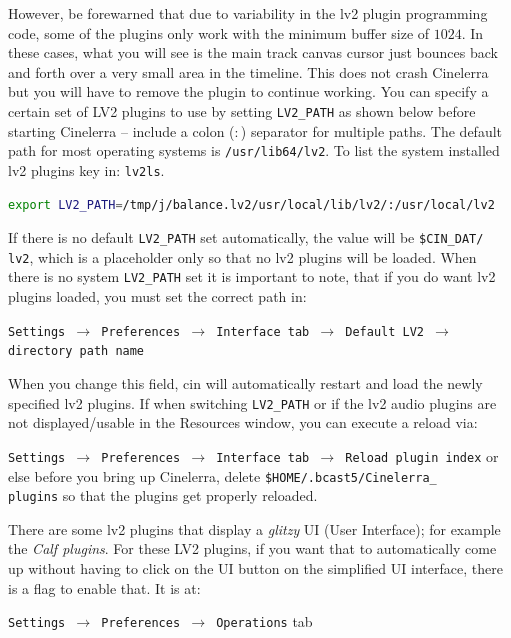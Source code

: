 However, be forewarned that due to variability in the lv2 plugin programming code, some of the plugins only work with the minimum buffer size of $1024$. In these cases, what you will see is the main track canvas cursor just bounces back and forth over a very small area in the timeline. This does not crash Cinelerra but you will have to remove the plugin to continue working.
You can specify a certain set of LV2 plugins to use by setting \texttt{LV2\_PATH} as shown below before starting Cinelerra -- include a colon ($:$) separator for multiple paths. The default path for most operating systems is \texttt{/usr/lib64/lv2}. To list the system installed lv2 plugins key in: \texttt{lv2ls}.

\begin{lstlisting}[language=Bash,numbers=none]
export LV2_PATH=/tmp/j/balance.lv2/usr/local/lib/lv2/:/usr/local/lv2
\end{lstlisting}

If there is no default \texttt{LV2\_PATH} set automatically, the value will be \texttt{\$CIN\_DAT/\\lv2}, which is a placeholder only so that no lv2 plugins will be loaded. When there is no system \texttt{LV2\_PATH} set it is important to note, that if you do want lv2 plugins loaded, you must set the correct path in:

\texttt{Settings $\rightarrow$ Preferences $\rightarrow$ Interface tab $\rightarrow$ Default LV2 $\rightarrow$ direc\-tory 
    path name}

When you change this field, cin will automatically restart and load the newly specified lv2 plugins. If when switching \texttt{LV2\_PATH} or if the lv2 audio plugins are not displayed/usable in the Resources window, you can execute a reload via:

\texttt{Settings $\rightarrow$  Preferences $\rightarrow$ Interface tab $\rightarrow$ Reload plugin in\-dex} 
or else before you bring up Cinelerra, delete \texttt{\$HOME/.bcast5/Cinelerra\_\\plugins} so that the plugins get properly reloaded.

There are some lv2 plugins that display a \textit{glitzy} UI (User Interface); for example the \textit{Calf plugins}. For these LV2 plugins, if you want that to automatically come up without having to click on the UI button on the simplified UI interface, there is a flag to enable that. It is at:

\texttt{Settings $\rightarrow$ Preferences $\rightarrow$ Operations} tab

